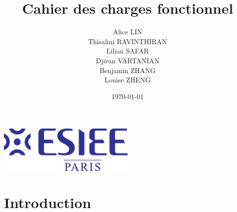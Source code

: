 \documentclass[a4paper,12pt]{report}  %
\title{Cahier des charges fonctionnel}
\author{
	Alice LIN \\
	Thisalini RAVINTHIRAN \\
	Lilian SAFAR \\
	Djivan VARTANIAN \\
	Benjamin ZHANG \\
	Louise ZHENG \\
}
\date{\today}
\begin{document}
	

\begin{titlepage}
\centering
\vspace*{9cm} 
{\LARGE \bfseries \thetitle \par}
\vspace{1cm} 
\large \theauthor \par
\vspace{0.5cm} 
\large \thedate \par
\vspace{4cm} 
\includegraphics[width=0.5\textwidth]{../Design/FichiersPoster/PDF/Logo_ESIEE.pdf} 
\vfill 
\end{titlepage}



%


\tableofcontents

\pagebreak


\section{Introduction}
\end{document}
